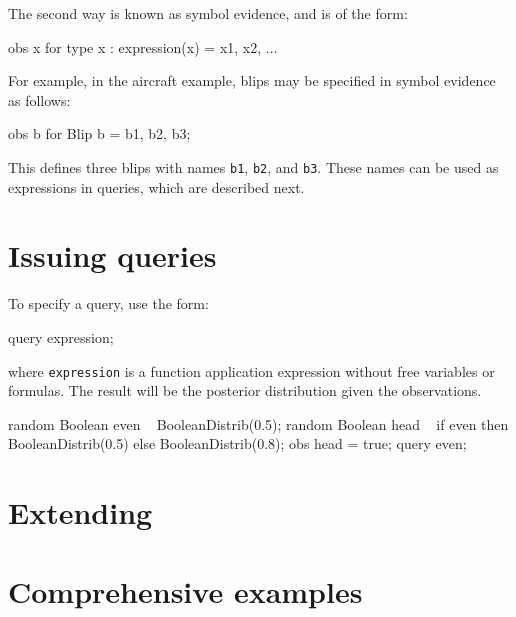 \documentclass[12pt]{article}
\begin{document}
The second way is known as symbol evidence, and is of the form:
\begin{blogcode}
obs {x for type x : expression(x)} = { x1, x2, ...}
\end{blogcode}

For example, in the aircraft example, blips may be specified in symbol evidence as follows:
\begin{blogcode}
obs {b for Blip b} = {b1, b2, b3};
\end{blogcode}
This defines three blips with names \texttt{b1}, \texttt{b2}, and \texttt{b3}.  These names can be used as expressions in queries, which are described next.

\section{Issuing queries}\label{query-section}
To specify a query, use the form:
\begin{blogcode}
query expression;
\end{blogcode}
where \texttt{expression} is a function application expression without free variables or formulas. The result will be the posterior distribution given the observations. 

\begin{blogcode}
random Boolean even ~ BooleanDistrib(0.5);
random Boolean head ~
  if even then BooleanDistrib(0.5)
  else BooleanDistrib(0.8);
obs head = true;
query even;
\end{blogcode}



\section{Extending \bl}\label{extending-section}


\section{Comprehensive examples}\label{example-section}




\clearpage
\appendix

{}
\end{document}
